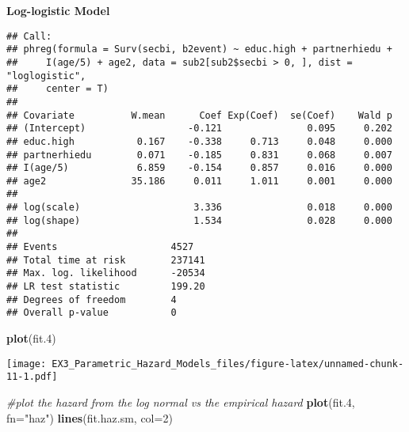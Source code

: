 \documentclass[
]{article}
\newenvironment{Shaded}{\begin{snugshade}}{\end{snugshade}}
\newcommand{\CommentTok}[1]{\textcolor[rgb]{0.56,0.35,0.01}{\textit{#1}}}
\newcommand{\DataTypeTok}[1]{\textcolor[rgb]{0.13,0.29,0.53}{#1}}
\newcommand{\DecValTok}[1]{\textcolor[rgb]{0.00,0.00,0.81}{#1}}
\newcommand{\FloatTok}[1]{\textcolor[rgb]{0.00,0.00,0.81}{#1}}
\newcommand{\KeywordTok}[1]{\textcolor[rgb]{0.13,0.29,0.53}{\textbf{#1}}}
\newcommand{\NormalTok}[1]{#1}
\newcommand{\OperatorTok}[1]{\textcolor[rgb]{0.81,0.36,0.00}{\textbf{#1}}}
\newcommand{\StringTok}[1]{\textcolor[rgb]{0.31,0.60,0.02}{#1}}
\begin{document}
\textbf{Log-logistic Model}

\begin{Shaded}
\end{Shaded}

\begin{verbatim}
## Call:
## phreg(formula = Surv(secbi, b2event) ~ educ.high + partnerhiedu + 
##     I(age/5) + age2, data = sub2[sub2$secbi > 0, ], dist = "loglogistic", 
##     center = T)
## 
## Covariate          W.mean      Coef Exp(Coef)  se(Coef)    Wald p
## (Intercept)                  -0.121               0.095     0.202 
## educ.high           0.167    -0.338     0.713     0.048     0.000 
## partnerhiedu        0.071    -0.185     0.831     0.068     0.007 
## I(age/5)            6.859    -0.154     0.857     0.016     0.000 
## age2               35.186     0.011     1.011     0.001     0.000 
## 
## log(scale)                    3.336               0.018     0.000 
## log(shape)                    1.534               0.028     0.000 
## 
## Events                    4527 
## Total time at risk        237141 
## Max. log. likelihood      -20534 
## LR test statistic         199.20 
## Degrees of freedom        4 
## Overall p-value           0
\end{verbatim}

\begin{Shaded}
\begin{Highlighting}[]
\KeywordTok{plot}\NormalTok{(fit}\FloatTok{.4}\NormalTok{)}
\end{Highlighting}
\end{Shaded}

\texttt{[image: EX3\_Parametric\_Hazard\_Models\_files/figure-latex/unnamed-chunk-11-1.pdf]}

\begin{Shaded}
\begin{Highlighting}[]
\CommentTok{#plot the hazard from the log normal vs the empirical hazard}
\KeywordTok{plot}\NormalTok{(fit}\FloatTok{.4}\NormalTok{, }\DataTypeTok{fn=}\StringTok{"haz"}\NormalTok{)}
\KeywordTok{lines}\NormalTok{(fit.haz.sm, }\DataTypeTok{col=}\DecValTok{2}\NormalTok{)}
\end{Highlighting}
\end{Shaded}
\end{document}
